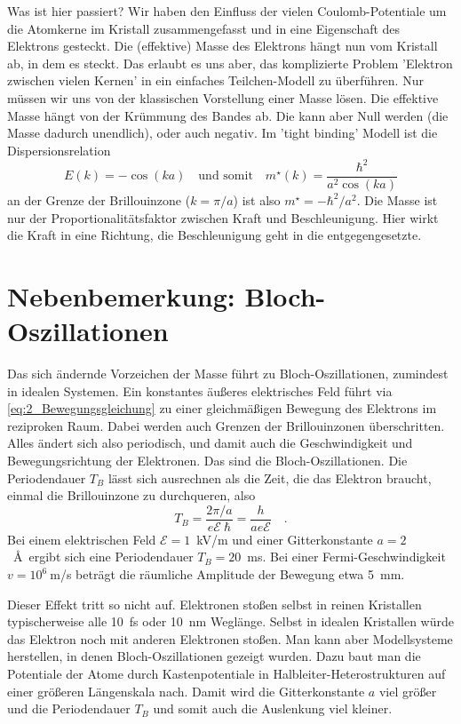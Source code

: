 Was ist hier passiert? 
Wir haben den Einfluss der vielen Coulomb-Potentiale um die Atomkerne im Kristall zusammengefasst und in eine Eigenschaft des Elektrons gesteckt. Die (effektive) Masse des Elektrons hängt nun vom Kristall ab, in dem es steckt. Das erlaubt es uns aber, das komplizierte Problem 'Elektron zwischen vielen Kernen' in ein einfaches Teilchen-Modell zu überführen. Nur müssen wir uns von der klassischen Vorstellung einer Masse lösen. Die effektive Masse hängt von der Krümmung des Bandes ab. Die kann aber Null werden (die Masse dadurch unendlich), oder auch negativ. Im 'tight binding' Modell ist die Dispersionsrelation
\begin{equation}
   E(k) = - \cos ( k a ) \quad \text{und somit} \quad    m^\star(k) = \frac{\hbar^2}{a^2 \cos ( k a )}
\end{equation}
an der Grenze der Brillouinzone ($k = \pi / a$) ist also $m^\star = - \hbar^2 / a^2$. Die Masse ist nur der Proportionalitätsfaktor zwischen Kraft und Beschleunigung. Hier wirkt die Kraft in eine Richtung, die Beschleunigung geht in die entgegengesetzte.


\section{Nebenbemerkung: Bloch-Oszillationen}

Das sich ändernde Vorzeichen der Masse führt zu Bloch-Oszillationen, zumindest in idealen Systemen. Ein konstantes äußeres elektrisches Feld führt via  \ref{eq:2_Bewegungsgleichung} zu einer gleichmäßigen Bewegung des Elektrons im reziproken Raum. Dabei werden auch Grenzen der Brillouinzonen überschritten. Alles ändert sich also periodisch, und damit auch die Geschwindigkeit und Bewegungsrichtung der Elektronen. Das sind die Bloch-Oszillationen. Die Periodendauer $T_B$ lässt sich ausrechnen als die Zeit, die das Elektron braucht, einmal die Brillouinzone zu durchqueren, also
\begin{equation}
   T_B = \frac{2\pi / a}{e \mathcal{E} \ \hbar} = \frac{h}{a e  \mathcal{E}} \quad .
\end{equation}
Bei einem elektrischen Feld $ \mathcal{E} =1 $~kV/m und einer Gitterkonstante $a= 2$~\AA\ ergibt sich eine Periodendauer $T_B = 20$~ms. Bei einer Fermi-Geschwindigkeit $v =10^6~$m/s beträgt die räumliche Amplitude der Bewegung etwa 5~mm. 

Dieser Effekt tritt so nicht auf. Elektronen stoßen selbst in reinen Kristallen typischerweise alle 10~fs oder 10~nm Weglänge. Selbst in idealen Kristallen würde das Elektron noch mit anderen Elektronen stoßen. Man kann aber Modellsysteme herstellen, in denen Bloch-Oszillationen gezeigt wurden. Dazu baut man die Potentiale der Atome durch Kastenpotentiale in Halbleiter-Heterostrukturen auf einer größeren Längenskala nach. Damit wird die Gitterkonstante $a$ viel größer und die Periodendauer $T_B$ und somit auch die Auslenkung viel kleiner.




